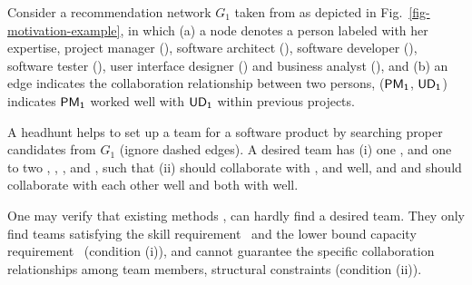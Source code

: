 \begin{example}
\label{exm-motivation}
Consider a recommendation network $G_1$ taken from \cite{TerveenM05} as depicted in Fig.~\ref{fig-motivation-example},
in which (a) a node denotes a person labeled with her expertise, \eg project manager (), software architect (), software developer (), software tester (),
user interface designer () and business analyst (),
and (b) an edge indicates the collaboration relationship between two persons, \eg (${\mathsf{PM_{1}}}$, ${\mathsf{UD_{1}}}$) indicates ${\mathsf{PM_{1}}}$ worked well with ${\mathsf{UD_{1}}}$ within previous projects.

A headhunt helps to set up a team for a software product by searching proper candidates from $G_1$ (ignore dashed edges).
A desired team has
(i) one , and one to two , , ,  and , such that
(ii)  should collaborate with ,  and  well, and  and  should collaborate with each other well and both with  well.


One may verify that existing methods \cite{Lappas09,Kargar11,GajewarS12,realTeamForm13}, can hardly find a desired team.
They only find teams satisfying the skill requirement~\cite{Lappas09,Kargar11,GajewarS12} and the lower bound capacity requirement~\cite{GajewarS12,realTeamForm13}  (condition (i)), and cannot guarantee  the specific collaboration relationships among team members, \ie structural constraints (condition (ii)).
 \end{example}

